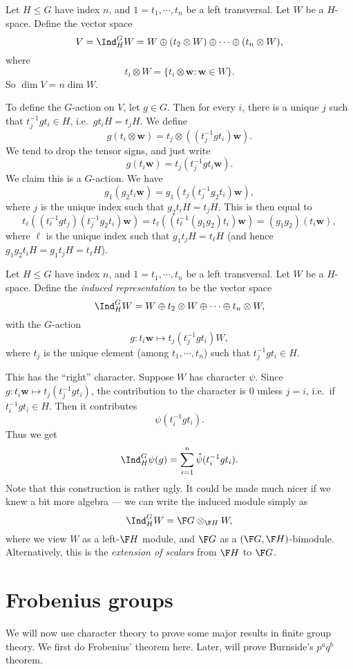 \documentclass[a4paper]{article}
\begin{document}
Let $H \leq G$ have index $n$, and $1 = t_1, \cdots, t_n$ be a left transversal. Let $W$ be a $H$-space. Define the vector space
\[
  V = \Ind_H^G W = W \oplus (t_2 \otimes W) \oplus \cdots \oplus (t_n \otimes W),
\]
where
\[
  t_i \otimes W = \{t_i \otimes \mathbf{w}: \mathbf{w} \in W\}.
\]
So $\dim V = n \dim W$.

To define the $G$-action on $V$, let $g \in G$. Then for every $i$, there is a unique $j$ such that $t_j^{-1} g t_i \in H$, i.e.\ $gt_iH = t_j H$. We define
\[
  g(t_i \otimes \mathbf{w}) = t_j \otimes ((t_j^{-1}gt_i) \mathbf{w}).
\]
We tend to drop the tensor signs, and just write
\[
  g(t_i \mathbf{w}) = t_j (t_j^{-1} g t_i \mathbf{w}).
\]
We claim this is a $G$-action. We have
\[
  g_1(g_2 t_i \mathbf{w}) = g_1(t_j(t_j^{-1} g_2 t_i)\mathbf{w}),
\]
where $j$ is the unique index such that $g_2 t_i H = t_j H$. This is then equal to
\[
  t_\ell ((t_\ell^{-1} g t_j)(t_j^{-1} g_2 t_i) \mathbf{w}) = t_\ell((t_\ell^{-1}(g_1g_2)t_i) \mathbf{w}) = (g_1g_2)(t_i \mathbf{w}),
\]
where $\ell$ is the unique index such that $g_1 t_j H = t_\ell H$ (and hence $g_1 g_2 t_i H = g_1 t_j H = t_\ell H$).

\begin{defi}
  Let $H \leq G$ have index $n$, and $1 = t_1, \cdots, t_n$ be a left transversal. Let $W$ be a $H$-space. Define the \emph{induced representation} to be the vector space
  \[
    \Ind_H^G W = W \oplus t_2 \otimes W \oplus \cdots \oplus t_n \otimes W,
  \]
  with the $G$-action
  \[
    g: t_i \mathbf{w} \mapsto t_j (t_j^{-1} g t_i)W,
  \]
  where $t_j$ is the unique element (among $t_1, \cdots, t_n$) such that $t_j^{-1} gt_i \in H$.
\end{defi}

This has the ``right'' character. Suppose $W$ has character $\psi$. Since $g: t_i \mathbf{w} \mapsto t_j (t_j^{-1} gt_i)$, the contribution to the character is $0$ unless $j = i$, i.e.\ if $t_i^{-1} g t_i \in H$. Then it contributes
\[
  \psi (t_i^{-1} g t_i).
\]
Thus we get
\[
  \Ind_H^G \psi(g) = \sum_{i = 1}^n \mathring{\psi}(t_i^{-1} g t_i).
\]
Note that this construction is rather ugly. It could be made much nicer if we knew a bit more algebra --- we can write the induced module simply as
\[
  \Ind_H^G W = \F G \otimes_{\F H} W,
\]
where we view $W$ as a left-$\F H$ module, and $\F G$ as a $(\F G, \F H)$-bimodule. Alternatively, this is the \emph{extension of scalars} from $\F H$ to $\F G$.

\section{Frobenius groups}
We will now use character theory to prove some major results in finite group theory. We first do Frobenius' theorem here. Later, will prove Burnside's $p^a q^b$ theorem.
\end{document}
